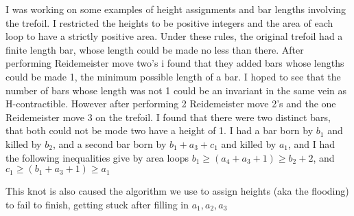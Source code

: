 \documentclass[11pt,oneside]{amsart}
\begin{document}
I was working on some examples of height assignments and bar lengths involving the trefoil. I restricted the heights to be positive integers and the area of each loop to have a strictly positive area. Under these rules, the original trefoil had a finite length bar, whose length could be made no less than there. After performing Reidemeister move two's i found that they added bars whose lengths could be made 1, the minimum possible length of a bar. I hoped to see that the number of bars whose length was not 1 could be an invariant in the same vein as H-contractible. However after performing 2 Reidemeister move 2's and the one Reidemeister move 3 on the trefoil. I found that there were two distinct bars, that both could not be mode two have a height of 1.
I had a bar born by $b_1$ and killed by $b_2$, and a second bar born by $b_1 + a_3 + c_1$ and killed by $a_1$, and I had the following inequalities give by area loops
$b_1 \geq (a_4 + a_3 + 1) \geq b_2 + 2$, and $c_1 \geq (b_1 + a_3 + 1) \geq a_1$

This knot is also caused the algorithm we use to assign heights (aka the flooding) to fail to finish, getting stuck after filling in $a_1, a_2, a_3$
\end{document}
